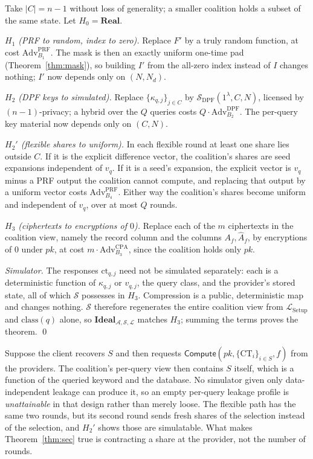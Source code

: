 \documentclass[a4paper,fleqn]{cas-dc}
\newcommand{\Real}{\mathbf{Real}}
\newcommand{\Ideal}{\mathbf{Ideal}}
\newcommand{\Leak}{\mathcal{L}}
\newcommand{\Sim}{\mathcal{S}}
\newcommand{\Adv}{\mathcal{A}}
\newcommand{\Compute}{\mathsf{Compute}}
\begin{document}
\begin{pf}
Take $|C|=n-1$ without loss of generality; a smaller coalition holds a subset
of the same state. Let $H_0=\Real$.

\emph{$H_1$ (PRF to random, index to zero).} Replace $F'$ by a truly random
function, at cost $\mathrm{Adv}^{\mathrm{PRF}}_{B_1}$. The mask is then an
exactly uniform one-time pad (Theorem~\ref{thm:mask}), so building $I'$ from
the all-zero index instead of $I$ changes nothing; $I'$ now depends only on
$(N,N_d)$.

\emph{$H_2$ (DPF keys to simulated).} Replace $\{\kappa_{q,j}\}_{j\in C}$ by
$\Sim_{\mathrm{DPF}}(1^\lambda,C,N)$, licensed by $(n{-}1)$-privacy; a hybrid
over the $Q$ queries costs $Q\cdot\mathrm{Adv}^{\mathrm{DPF}}_{B_2}$. The
per-query key material now depends only on $(C,N)$.

\emph{$H_2'$ (flexible shares to uniform).} In each flexible round at least one
share lies outside $C$. If it is the explicit difference vector, the
coalition's shares are seed expansions independent of $v_q$. If it is a seed's
expansion, the explicit vector is $v_q$ minus a PRF output the coalition cannot
compute, and replacing that output by a uniform vector costs
$\mathrm{Adv}^{\mathrm{PRF}}_{B_4}$. Either way the coalition's shares become
uniform and independent of $v_q$, over at most $Q$ rounds.

\emph{$H_3$ (ciphertexts to encryptions of $0$).} Replace each of the $m$
ciphertexts in the coalition view, namely the record column and the columns
$A_f,\widehat A_f$, by encryptions of $0$ under $pk$,
at cost $m\cdot\mathrm{Adv}^{\mathrm{CPA}}_{B_3}$, since the coalition holds
only $pk$.

\emph{Simulator.} The responses $\text{ct}_{q,j}$ need not be simulated
separately: each is a deterministic function of $\kappa_{q,j}$ or $v_{q,j}$,
the query class, and the provider's stored state, all of which $\Sim$
possesses in $H_3$. Compression is a public, deterministic map and changes
nothing. $\Sim$ therefore regenerates the entire coalition view from
$\Leak_{\mathrm{Setup}}$ and $\mathrm{class}(q)$ alone, so
$\Ideal_{\Adv,\Sim,\Leak}$ matches $H_3$; summing the terms proves the
theorem. \qed
\end{pf}

\begin{remark}
\label{rem:v1}
Suppose the client recovers $S$ and then requests
$\Compute(pk,\{\text{CT}_i\}_{i\in S},f)$ from the providers. The coalition's
per-query view then contains $S$ itself, which is a function of the queried
keyword and the database. No simulator given only data-independent leakage can
produce it, so an empty per-query leakage profile is \emph{unattainable} in
that design rather than merely loose. The flexible path has the same two
rounds, but its second round sends fresh shares of the selection instead of
the selection, and $H_2'$ shows those are simulatable. What makes
Theorem~\ref{thm:sec} true is contracting a share at the provider, not the
number of rounds.
\end{remark}
\end{document}
